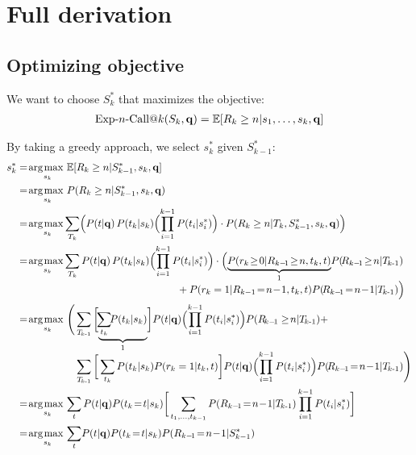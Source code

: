 \section{Full derivation}
\subsection{Optimizing objective}
We want to choose $S_k^*$ that maximizes the objective:
\begin{align*}
  \ExpNCall{n}(S_k,\vec{q})
  = \mathbb{E}[R_k\geq n|s_1,\dots,s_k,\vec{q}]
\end{align*}

\noindent
By taking a greedy approach, we select $s_k^*$ given $S_{k-1}^*$:
\begin{align}
  s_k^* & = \argmax_{s_k} \mathbb{E}[R_k\geq n|S_{k-1}^*,s_k,\vec{q}] \nonumber\\
% 
  & = \argmax_{s_k} P(R_k\geq n|S_{k-1}^*,s_k,\vec{q}) \label{note1}\\
%
  & = \argmax_{s_k} \!\sum_{T_k} \Bigl( P(t|\vec{q}) \,P(t_k|s_k) \Bigl( \prod_{i=1}^{k-1} P(t_i|s_i^*) \Bigr) \cdot P(R_k\geq n|T_k,S_{k-1}^*,s_k,\vec{q}) \Bigr) \label{note2}\\
%
  & = \argmax_{s_k} \!\sum_{T_k} P(t|\vec{q}) \,P(t_k|s_k) \Bigl( \prod_{i=1}^{k-1} P(t_i|s_i^*) \Bigr) \cdot \Bigl( \mbox{$\underbrace{P(r_k\!\geq\!0|R_{k-\!1}\!\geq\!n,t_k,t)}_{1}$} P(\!R_{k-\!1}\!\geq\!n|\TlessK) \nonumber \\[-1.5mm]
  & \hspace{55mm} + P(r_k=1|R_{k-1}\!=\!n\!-\!1,t_k,t) P(\!R_{k-\!1}\!=\!n\!-\!1|\TlessK) \Big) \label{note3}\\
%
  & = \argmax_{s_k} \Bigg( \sum_{\TlessK} \bigg[ \mbox{$\underbrace{ \!\sum_{t_k} \!\!P(t_k|s_k) }_{1}$} \bigg] P(t|\vec{q}) \Bigl( \prod_{i=1}^{k-1} P(t_i|s_i^*) \Bigr) P(R_{\!k-\!1}\geq\!n|\TlessK) + \nonumber \\[-1.5mm]
  & \hspace{20mm} \sum_{\TlessK} \bigg[ \sum_{t_k} P(t_k|s_k) P(r_k=1|t_k,t) \bigg] P(t|\vec{q}) \Bigl( \prod_{i=1}^{k-1} P(t_i|s_i^*) \Bigr) P(\!R_{k-\!1}\!=\!n\!-\!1|\TlessK) \Bigg) \nonumber\\
%
  & = \argmax_{s_k} \sum_{t} P(t|\vec{q}) P(t_k\!=\!t|s_k) \bigg[ \sum_{t_1, \dots, t_{k-1}}  P(R_{k-\!1}\!=\!n\!-\!1|\TlessK) \prod_{i=1}^{k-1} P(t_i|s_i^*) \bigg] \label{note4}\\
%
  & = \argmax_{s_k} \sum_{t} \!P(t|\vec{q}) P(t_k\!=\!t|s_k) P(R_{k-\!1}\!=\!n\!-\!1|S_{k-1}^*) \label{eq.ncall-repeat}
\end{align}

